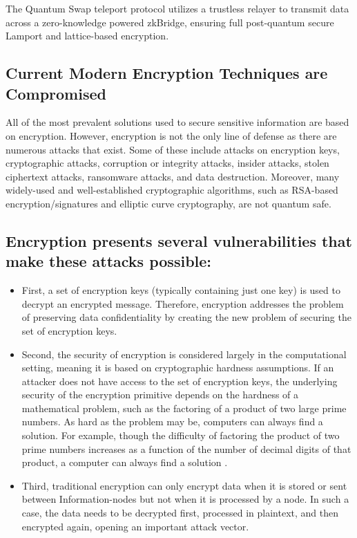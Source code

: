 \documentclass[11pt]{article}
\begin{document}
The Quantum Swap teleport protocol utilizes a trustless relayer to transmit data across a zero-knowledge powered zkBridge, ensuring full post-quantum secure Lamport and lattice-based encryption.


\subsection{Current Modern Encryption Techniques are Compromised}

All of the most prevalent solutions used to secure sensitive information are based on encryption. However, encryption is not the only line of defense as there are numerous attacks that exist. Some of these include attacks on encryption keys, cryptographic attacks, corruption or integrity attacks, insider attacks, stolen ciphertext attacks, ransomware attacks, and data destruction. Moreover, many widely-used and well-established cryptographic algorithms, such as RSA-based encryption/signatures and elliptic curve cryptography, are not quantum safe.


\subsection{Encryption presents several vulnerabilities that make these attacks possible:}
\begin{itemize}
  \item First, a set of encryption keys (typically containing just one key) is used to decrypt an encrypted message. Therefore, encryption addresses the problem of preserving data confidentiality by creating the new problem of securing the set of encryption keys.
  \item Second, the security of encryption is considered largely in the computational setting, meaning it is based on cryptographic hardness assumptions. If an attacker does not have access to the set of encryption keys, the underlying security of the encryption primitive depends on the hardness of a mathematical problem, such as the factoring of a product of two large prime numbers. As hard as the problem may be, computers can always find a solution. For example, though the difficulty of factoring the product of two prime numbers increases as a function of the number of decimal digits of that product, a computer can always find a solution .
  \item Third, traditional encryption can only encrypt data when it is stored or sent between Information-nodes but not when it is processed by a node. In such a case, the data needs to be decrypted first, processed in plaintext, and then encrypted again, opening an important attack vector.
\end{itemize}
\end{document}

